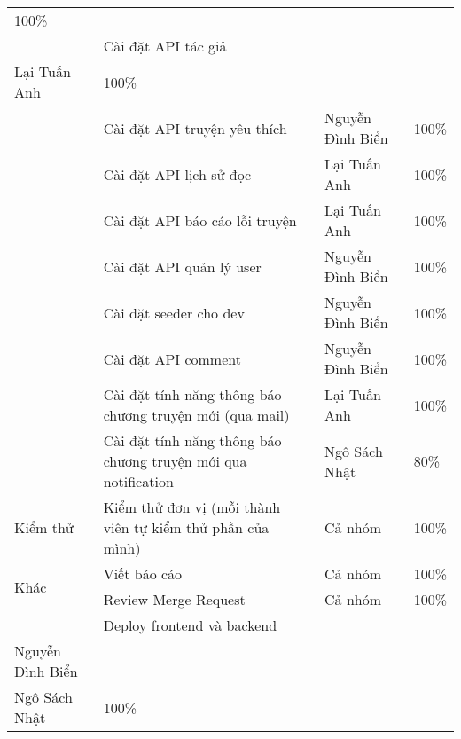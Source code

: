 \documentclass[./../main.tex]{subfiles}
\begin{document}
\begin{center}
\begin{longtable}{|p{}|p{}|p{}|p{}|}
          100\% \\ \cline{2-4} 
         &
          Cài đặt API tác giả &
          \begin{tabular}[c]{@{}l@{}}Nguyễn Đình Biển\\ Lại Tuấn Anh\end{tabular} &
          100\% \\ \cline{2-4} 
         &
          Cài đặt API truyện yêu thích &
          Nguyễn Đình Biển &
          100\% \\ \cline{2-4} 
         &
          Cài đặt API lịch sử đọc &
          Lại Tuấn Anh &
          100\% \\ \cline{2-4} 
         &
          Cài đặt API báo cáo lỗi truyện &
          Lại Tuấn Anh &
          100\% \\ \cline{2-4} 
         &
          Cài đặt API quản lý user &
          Nguyễn Đình Biển &
          100\% \\ \cline{2-4} 
         &
          Cài đặt seeder cho dev &
          Nguyễn Đình Biển &
          100\% \\ \cline{2-4} 
         &
          Cài đặt API comment &
          Nguyễn Đình Biển &
          100\% \\ \cline{2-4} 
         &
          Cài đặt tính năng thông báo chương truyện mới (qua mail) &
          Lại Tuấn Anh &
          100\% \\ \cline{2-4} 
         &
          Cài đặt tính năng thông báo chương truyện mới qua notification &
          Ngô Sách Nhật &
          80\% \\ \hline
        Kiểm thử &
          Kiểm thử đơn vị (mỗi thành viên tự kiểm thử phần của mình) &
          Cả nhóm &
          100\% \\ \hline
        \multirow{2}{*}{Khác} &
          Viết báo cáo &
          Cả nhóm &
          100\% \\ \cline{2-4} 
        &
          Review Merge Request &
          Cả nhóm &
          100\% \\ \cline{2-4}
         &
          Deploy frontend và backend &
          \begin{tabular}[c]{@{}l@{}}Lại Tuấn Anh\\ Nguyễn Đình Biển\\ Ngô Sách Nhật\end{tabular} &
          100\% \\ \hline
        \end{longtable}
\end{center}
\end{document}
